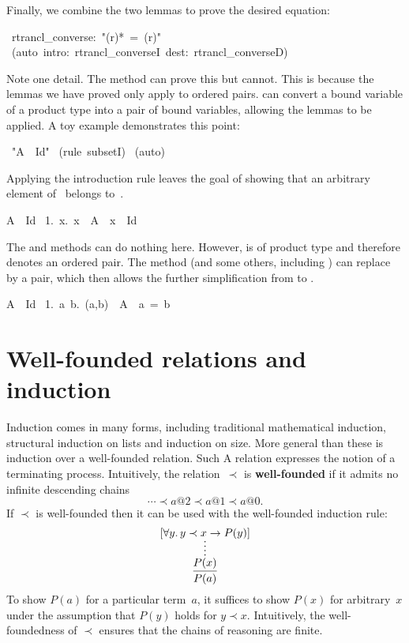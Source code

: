 Finally, we combine the two lemmas to prove the desired equation: 
\begin{isabelle}
\ rtrancl_converse:\ "(r){\isacharcircum}*\ =\ (r\isacharcircum{*}){\isacharcircum}"\isanewline
{}\ (auto\ intro:\
rtrancl_converseI\ dest:\
rtrancl_converseD)\isanewline
{}
\end{isabelle}

Note one detail. The {} method can prove this but
{} cannot. 
This is because the
lemmas we have proved only apply  to ordered pairs. {} can
convert a bound variable of  a product type into a pair of bound variables,
allowing the lemmas  to be applied.  A toy example demonstrates this
point:
\begin{isabelle}
\ "A\ \isasymsubseteq\ Id"\isanewline
{}\ (rule\ subsetI)\isanewline
\isacommand{apply}\ (auto)
\end{isabelle}
Applying the introduction rule  leaves the goal of showing
that an arbitrary element of~ belongs to~.
\begin{isabelle}
A\ \isasymsubseteq\ Id\isanewline
\ 1.\ {\isasymAnd}x.\ x\ \isasymin\ A\ \isasymLongrightarrow\ x\ \isasymin\ Id
\end{isabelle}
The \isa{simp} and \isa{blast} methods can do nothing here.  However,
\isa{x} is of product type and therefore denotes an ordered pair.  The
\isa{auto} method (and some others, including \isa{clarify})
can replace
\isa{x} by a pair, which then allows the further simplification from
 to .
\begin{isabelle}
A\ \isasymsubseteq\ Id\isanewline
\ 1.\ {\isasymAnd}a\ b.\ (a,b)\ \isasymin\ A\ \isasymLongrightarrow\ a\ =\ b
\end{isabelle}



\section{Well-founded relations and induction}

Induction comes in many forms, including traditional mathematical 
induction, structural induction on lists and induction on size. 
More general than these is induction over a well-founded relation. 
Such A relation expresses the notion of a terminating process. 
Intuitively, the relation~$\prec$ is \textbf{well-founded} if it admits no
infinite  descending chains
\[ \cdots \prec a@2 \prec a@1 \prec a@0. \]
If $\prec$ is well-founded then it can be used with the well-founded 
induction rule: 
\[ \infer{P(a)}{\infer*{P(x)}{[\forall y.\, y\prec x \imp P(y)]}} \]
To show $P(a)$ for a particular term~$a$, it suffices to show $P(x)$ for
arbitrary~$x$ under the assumption that $P(y)$ holds for $y\prec x$. 
Intuitively, the well-foundedness of $\prec$ ensures that the chains of
reasoning are finite.

